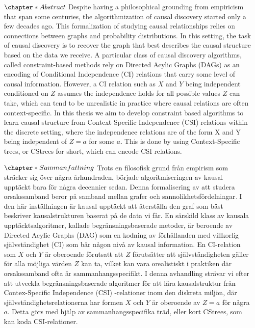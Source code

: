 \documentclass{tufte-book}
\author{nazaal}
\date{\today}
\title{}
\begin{document}
\setlength\parindent{0pt}
\setcounter{secnumdepth}{2}
\newcommand{\indep}{\perp \!\!\! \perp}

\(\chapter*{Abstract}\)
Despite having a philosophical grounding from empiricism that span some centuries, the algorithmization of causal discovery started only a few decades ago. This formalization of studying causal relationships relies on connections between graphs and probability distributions. In this setting, the task of causal discovery is to recover the graph that best describes the causal structure based on the data we receive. A particular class of causal discovery algorithms, called constraint-based methods rely on Directed Acylic Graphs (DAGs) as an encoding of Conditional Independence (CI) relations that carry some level of causal information. However, a CI relation such as \(X\) and \(Y\) being independent conditioned on \(Z\) assumes the independence holds for all possible values \(Z\) can take, which can tend to be unrealistic in practice where causal relations are often context-specific.  In this thesis we aim to develop constraint based algorithms to learn causal structure from Context-Specific Independence (CSI) relations within the discrete setting, where the independence relations are of the form X and Y being independent of \(Z=a\) for some \(a\). This is done by using Context-Specific trees, or CStrees for short, which can encode CSI relations.

\(\chapter*{Sammanfattning}\)
Trots en filosofisk grund från empirism som sträcker sig över några århundraden, började algoritmiseringen av kausal upptäckt bara för några decennier sedan. Denna formalisering av att studera orsakssamband beror på samband mellan grafer och sannolikhetsfördelningar. I den här inställningen är kausal upptäckt att återställa den graf som bäst beskriver kausalstrukturen baserat på de data vi får. En särskild klass av kausala upptäcktsalgoritmer, kallade begränsningsbaserade metoder, är beroende av Directed Acylic Graphs (DAG) som en kodning av förhållanden med villkorlig självständighet (CI) som bär någon nivå av kausal information. En CI-relation som \(X\) och \(Y\) är oberoende förutsatt att \(Z\) förutsätter att självständigheten gäller för alla möjliga värden \(Z\) kan ta, vilket kan vara orealistiskt i praktiken där orsakssamband ofta är sammanhangsspecifikt. I denna avhandling strävar vi efter att utveckla begränsningsbaserade algoritmer för att lära kausalstruktur från Contex-Specific Independence (CSI) -relationer inom den diskreta miljön, där självständighetsrelationerna har formen \(X\) och \(Y\) är oberoende av \(Z = a\) för några \(a\). Detta görs med hjälp av sammanhangsspecifika träd, eller kort CStrees, som kan koda CSI-relationer.
\end{document}
